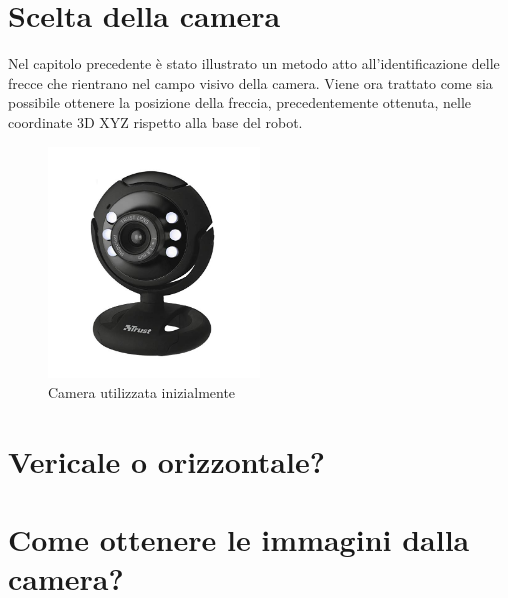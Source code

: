 \section{Scelta della camera}
Nel capitolo precedente è stato illustrato un metodo atto all'identificazione delle frecce che rientrano nel campo visivo della camera. Viene ora trattato come sia possibile ottenere la posizione della freccia, precedentemente ottenuta, nelle coordinate 3D XYZ rispetto alla base del robot.



\begin{figure}
	\centering
	\includegraphics[width=0.5\textwidth]{Immagini/TrustCam.jpg}
	\caption{Camera utilizzata inizialmente}
	\label{fig:TrustCam}
\end{figure}


\section{Vericale o orizzontale?}
\section{Come ottenere le immagini dalla camera?}
